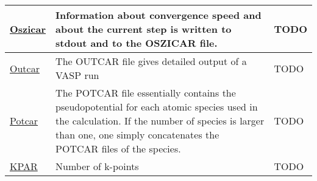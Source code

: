 \documentclass[12pt]{article}
\begin{document}
\begin{center}
\begin{table}[ht]
\begin{tabularx}{\linewidth}{|>{\RaggedRight}p{2.5cm}|x|x|}
 \href{https://www.vasp.at/wiki/index.php/OSZICAR}{Oszicar} &
 Information about convergence speed and about the current step is written to stdout and to the OSZICAR file. &
 TODO \\ \hline
 
 \href{https://www.vasp.at/wiki/index.php/OUTCAR}{Outcar} &
 The OUTCAR file gives detailed output of a VASP run &
 TODO \\ \hline
 
 \href{https://www.vasp.at/wiki/index.php/POTCAR}{Potcar} &
 The POTCAR file essentially contains the pseudopotential for each atomic species used in the calculation. If the number of species is larger than one, one simply concatenates the POTCAR files of the species. &
 TODO \\ \hline
 
 \href{https://www.vasp.at/wiki/index.php/KPAR}{KPAR} &
 Number of k-points &
 TODO \\ \hline
\end{tabularx}
\end{table}
\end{center}
\end{document}
